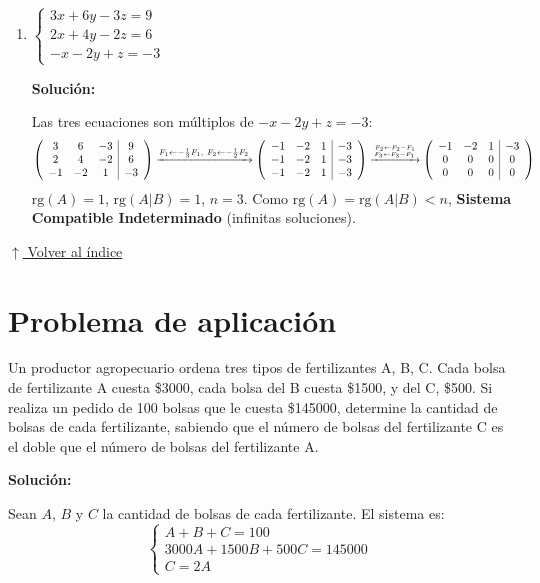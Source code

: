 \documentclass[12pt]{article}
\newcommand{\solucion}{%
    \vspace{0.8em}%
    \textbf{Solución:}%
}
\newcommand{\volverindice}{%
    \vspace{1em}%
    \begin{flushright}%
        \hyperlink{indice}{\small $\uparrow$ Volver al índice}%
    \end{flushright}%
}
\begin{document}
\begin{enumerate}[label=\alph*.-]
    \newpage
    \item $\begin{cases} 3x + 6y - 3z = 9 \\ 2x + 4y - 2z = 6 \\ -x - 2y + z = -3 \end{cases}$

    \solucion

    Las tres ecuaciones son múltiplos de $-x-2y+z=-3$:
    \[
    \left(\begin{array}{ccc|c}3&6&-3&9\\2&4&-2&6\\-1&-2&1&-3\end{array}\right)
    \xrightarrow{F_1 \leftarrow -\frac{1}{3}F_1,\ F_2 \leftarrow -\frac{1}{2}F_2}
    \left(\begin{array}{ccc|c}-1&-2&1&-3\\-1&-2&1&-3\\-1&-2&1&-3\end{array}\right)
    \xrightarrow{F_2\leftarrow F_2-F_1 \atop F_3\leftarrow F_3-F_1}
    \left(\begin{array}{ccc|c}-1&-2&1&-3\\0&0&0&0\\0&0&0&0\end{array}\right)
    \]
    $\text{rg}(A)=1$, $\text{rg}(A|B)=1$, $n=3$. Como $\text{rg}(A)=\text{rg}(A|B)<n$,
    \textbf{Sistema Compatible Indeterminado} (infinitas soluciones).
\end{enumerate}

\volverindice
\newpage

\section{Problema de aplicación}

Un productor agropecuario ordena tres tipos de fertilizantes A, B, C. Cada bolsa de fertilizante A cuesta \$3000, cada bolsa del B cuesta \$1500, y del C, \$500. Si realiza un pedido de 100 bolsas que le cuesta \$145000, determine la cantidad de bolsas de cada fertilizante, sabiendo que el número de bolsas del fertilizante C es el doble que el número de bolsas del fertilizante A.

\solucion

Sean $A$, $B$ y $C$ la cantidad de bolsas de cada fertilizante. El sistema es:
\[
\begin{cases}
A + B + C = 100\\
3000A + 1500B + 500C = 145000\\
C = 2A
\end{cases}
\]
\end{document}
